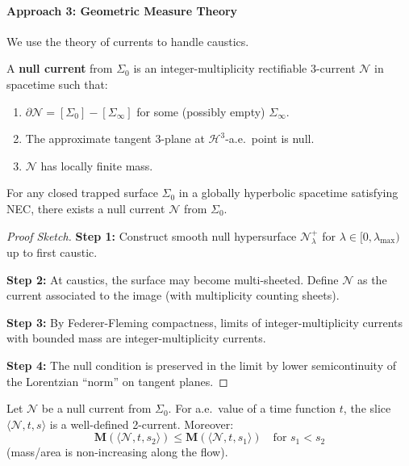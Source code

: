 \paragraph{Approach 3: Geometric Measure Theory}

We use the theory of currents to handle caustics.

\begin{definition}
A \textbf{null current} from $\Sigma_0$ is an integer-multiplicity rectifiable 3-current $\mathcal{N}$ in spacetime such that:
\begin{enumerate}
    \item $\partial\mathcal{N} = [\Sigma_0] - [\Sigma_\infty]$ for some (possibly empty) $\Sigma_\infty$.
    \item The approximate tangent 3-plane at $\mathcal{H}^3$-a.e.\ point is null.
    \item $\mathcal{N}$ has locally finite mass.
\end{enumerate}
\end{definition}

\begin{theorem}\label{thm:nullcurrent}
For any closed trapped surface $\Sigma_0$ in a globally hyperbolic spacetime satisfying NEC, there exists a null current $\mathcal{N}$ from $\Sigma_0$.
\end{theorem}

\begin{proof}[Proof Sketch]
\textbf{Step 1:} Construct smooth null hypersurface $\mathcal{N}^+_\lambda$ for $\lambda \in [0, \lambda_{\max})$ up to first caustic.

\textbf{Step 2:} At caustics, the surface may become multi-sheeted. Define $\mathcal{N}$ as the current associated to the image (with multiplicity counting sheets).

\textbf{Step 3:} By Federer-Fleming compactness, limits of integer-multiplicity currents with bounded mass are integer-multiplicity currents.

\textbf{Step 4:} The null condition is preserved in the limit by lower semicontinuity of the Lorentzian ``norm'' on tangent planes.
\end{proof}

\begin{theorem}\label{thm:slicing}
Let $\mathcal{N}$ be a null current from $\Sigma_0$. For a.e.\ value of a time function $t$, the slice $\langle\mathcal{N}, t, s\rangle$ is a well-defined 2-current. Moreover:
\begin{equation}
    \mathbf{M}(\langle\mathcal{N}, t, s_2\rangle) \leq \mathbf{M}(\langle\mathcal{N}, t, s_1\rangle) \quad \text{for } s_1 < s_2
\end{equation}
(mass/area is non-increasing along the flow).
\end{theorem}

